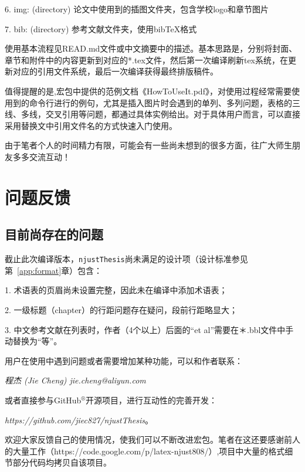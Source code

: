 6. img: (directory) 论文中使用到的插图文件夹，包含学校logo和章节图片

7. bib: (directory) 参考文献文件夹，使用bibTeX格式

使用基本流程见READ.md文件或中文摘要中的描述。基本思路是，分别将封面、章节和附件中的内容更新到对应的*.tex文件，然后第一次编译刷新tex系统，在更新对应的引用文件系统，最后一次编译获得最终排版稿件。

值得提醒的是,宏包中提供的范例文档《HowToUseIt.pdf》，对使用过程经常需要使用到的命令行进行的例句，尤其是插入图片时会遇到的单列、多列问题，表格的三线、多线，交叉引用等问题，都通过具体实例给出。对于具体用户而言，可以直接采用替换文中引用文件名的方式快速入门使用。

由于笔者个人的时间精力有限，可能会有一些尚未想到的很多方面，往广大师生朋友多多交流互动！

\section{问题反馈}
\label{sec:FandQ}

\subsection{目前尚存在的问题}
\label{sec:remainingProblem}
截止此次编译版本，\texttt{njustThesis}尚未满足的设计项（设计标准参见第~\ref{app:format}章）包含：

1. 术语表的页眉尚未设置完整，因此未在编译中添加术语表；

2. 一级标题（chapter）的行距问题存在疑问，段前行距略显大；

3. 中文参考文献在列表时，作者（4个以上）后面的“et al”需要在＊.bbl文件中手动替换为“等”。


用户在使用中遇到问题或者需要增加某种功能，可以和作者联系：

{\it{程杰 (Jie Cheng) \quad jie.cheng@aliyun.com}}

或者直接参与GitHub$^{\circledR}$开源项目，进行互动性的完善开发：

{\it{https://github.com/jiec827/njustThesis}}。

欢迎大家反馈自己的使用情况，使我们可以不断改进宏包。笔者在这还要感谢前人的大量工作（https://code.google.com/p/latex-njust808/）,项目中大量的格式细节部分代码均拷贝自该项目。
